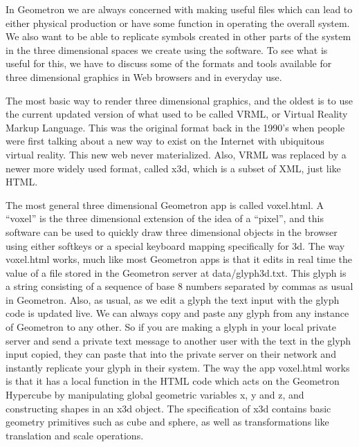 In Geometron we are always concerned with making useful files which can lead to either physical production or have some function in operating the overall system.  We also want to be able to replicate symbols created in other parts of the system in the three dimensional spaces we create using the software.  To see what is useful for this, we have to discuss some of the formats and tools available for three dimensional graphics in Web browsers and in everyday use.  

The most basic way to render three dimensional graphics, and the oldest is to use the current updated version of what used to be called VRML, or Virtual Reality Markup Language.  This was the original format back in the 1990's when people were first talking about a new way to exist on the Internet with ubiquitous virtual reality.  This new web never materialized.  Also, VRML was replaced by a newer more widely used format, called x3d, which is a subset of XML, just like HTML.

The most general three dimensional Geometron app is called voxel.html.  A ``voxel'' is the three dimensional extension of the idea of a ``pixel'', and this software can be used to quickly draw three dimensional objects in the browser using either softkeys or a special keyboard mapping specifically for 3d.  The way voxel.html works, much like most Geometron apps is that it edits in real time the value of a file stored in the Geometron server at data/glyph3d.txt.  This glyph is a string consisting of a sequence of base 8 numbers separated by commas as usual in Geometron.  Also, as usual, as we edit a glyph the text input with the glyph code is updated live.  We can always copy and paste any glyph from any instance of Geometron to any other. So if you are making a glyph in your local private server and send a private text message to another user with the text in the glyph input copied, they can paste that into the private server on their network and instantly replicate your glyph in their system.  The way the app voxel.html works is that it has a local function in the HTML code which acts on the Geometron Hypercube by manipulating global geometric variables x, y and z, and constructing shapes in an x3d object.  The specification of x3d contains basic geometry primitives such as cube and sphere, as well as transformations like translation and scale operations.

